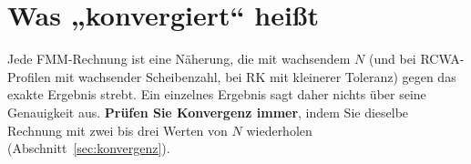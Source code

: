 \section{Was „konvergiert“ heißt}
%
Jede FMM-Rechnung ist eine Näherung, die mit wachsendem $N$ (und bei RCWA-Profilen mit wachsender Scheibenzahl,
bei RK mit kleinerer Toleranz) gegen das exakte Ergebnis strebt. Ein einzelnes Ergebnis sagt daher nichts über seine
Genauigkeit aus. \textbf{Prüfen Sie Konvergenz immer}, indem Sie dieselbe Rechnung mit zwei bis drei Werten von $N$
wiederholen (Abschnitt~\ref{sec:konvergenz}).
